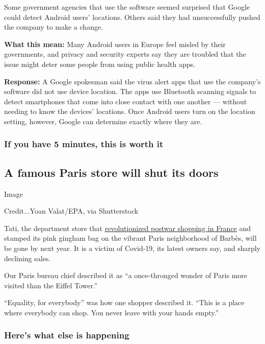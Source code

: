 Some government agencies that use the software seemed surprised that
Google could detect Android users' locations. Others said they had
unsuccessfully pushed the company to make a change.

\textbf{What this mean:} Many Android users in Europe feel misled by
their governments, and privacy and security experts say they are
troubled that the issue might deter some people from using public health
apps.

\textbf{Response:} A Google spokesman said the virus alert apps that use
the company's software did not use device location. The apps use
Bluetooth scanning signals to detect smartphones that come into close
contact with one another --- without needing to know the devices'
locations. Once Android users turn on the location setting, however,
Google can determine exactly where they are.

\hypertarget{if-you-have-5-minutes-this-is-worth-it}{%
\subsubsection{If you have 5 minutes, this is worth
it}\label{if-you-have-5-minutes-this-is-worth-it}}

\hypertarget{a-famous-paris-store-will-shut-its-doors}{%
\subsection{A famous Paris store will shut its
doors}\label{a-famous-paris-store-will-shut-its-doors}}

Image

Credit...Yoan Valat/EPA, via Shutterstock

Tati, the department store that
\href{https://www.nytimes.com/2020/07/20/world/europe/france-paris-tati-coronavirus.html}{revolutionized
postwar shopping in France} and stamped its pink gingham bag on the
vibrant Paris neighborhood of Barbès, will be gone by next year. It is a
victim of Covid-19, its latest owners say, and sharply declining sales.

Our Paris bureau chief described it as ``a once-thronged wonder of Paris
more visited than the Eiffel Tower.''

``Equality, for everybody'' was how one shopper described it. ``This is
a place where everybody can shop. You never leave with your hands
empty.''

\hypertarget{heres-what-else-is-happening}{%
\subsubsection{Here's what else is
happening}\label{heres-what-else-is-happening}}

